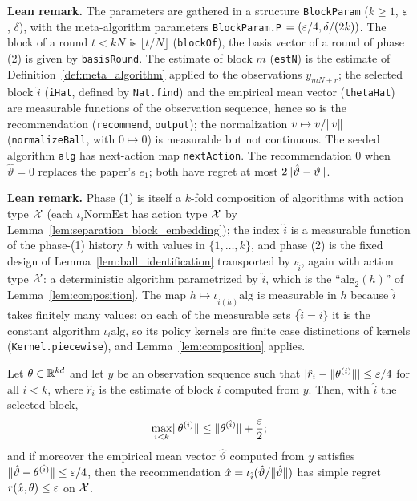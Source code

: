 \textbf{Lean remark.} The parameters are gathered in a structure \texttt{BlockParam}
($k \ge 1$, $\varepsilon$, $\delta$), with the meta-algorithm parameters
\texttt{BlockParam.P} $= (\varepsilon/4, \delta/(2k))$. The block of a round $t < kN$ is
$\lfloor t/N \rfloor$ (\texttt{blockOf}), the basis vector of a round of phase (2) is given by
\texttt{basisRound}. The estimate of block $m$ (\texttt{estN}) is the estimate of
Definition~\ref{def:meta_algorithm} applied to the observations $y_{mN + r}$; the selected block
$\hat i$ (\texttt{iHat}, defined by \texttt{Nat.find}) and the empirical mean vector
(\texttt{thetaHat}) are measurable functions of the observation sequence, hence so is the
recommendation (\texttt{recommend}, \texttt{output}); the normalization $v \mapsto v/\lVert v \rVert$
(\texttt{normalizeBall}, with $0 \mapsto 0$) is measurable but not continuous. The seeded
algorithm \texttt{alg} has next-action map \texttt{nextAction}. The recommendation $0$ when
$\hat\vartheta = 0$ replaces the paper's $e_1$; both have regret at most $2\lVert \hat\vartheta - \vartheta \rVert$.

\textbf{Lean remark.} Phase (1) is itself a $k$-fold composition of algorithms with action
type $\mathcal{X}$ (each $\iota_i\mathrm{NormEst}$ has action type $\mathcal{X}$ by
Lemma~\ref{lem:separation_block_embedding}); the index $\hat i$ is a
measurable function of the phase-(1) history $h$ with values in $\{1,\dots,k\}$, and phase (2)
is the fixed design of Lemma~\ref{lem:ball_identification} transported by $\iota_{\hat i}$,
again with action type $\mathcal{X}$: a deterministic algorithm parametrized by $\hat i$, which is
the ``$\mathrm{alg}_2(h)$'' of Lemma~\ref{lem:composition}. The map
$h \mapsto \iota_{\hat i(h)}\mathrm{alg}$ is measurable in $h$ because $\hat i$ takes finitely
many values: on each of the measurable sets $\{\hat i = i\}$ it is the constant algorithm
$\iota_i\mathrm{alg}$, so its policy kernels are finite case distinctions of kernels
(\texttt{Kernel.piecewise}), and Lemma~\ref{lem:composition} applies.

\begin{lemma}\label{lem:block_selection}
\leanok
{}
Let $\theta \in \mathbb{R}^{kd}$ and let $y$ be an observation sequence such that
$\lvert \hat r_i - \lVert \theta^{(i)} \rVert \rvert \le \varepsilon/4$ for all $i < k$, where $\hat r_i$ is the estimate
of block $i$ computed from $y$. Then, with $\hat i$ the selected block,
\[
  \max_{i<k}\lVert \theta^{(i)} \rVert \le \lVert \theta^{(\hat i)} \rVert + \frac{\varepsilon}{2} ;
\]
and if moreover the empirical mean vector $\hat\vartheta$ computed from $y$ satisfies
$\lVert \hat\vartheta - \theta^{(\hat i)} \rVert \le \varepsilon/4$, then the recommendation
$\hat{x} = \iota_{\hat i}(\hat\vartheta/\lVert \hat\vartheta \rVert)$ has simple regret
$r(\hat{x}, \theta) \le \varepsilon$ on $\mathcal{X}$.
\end{lemma}

